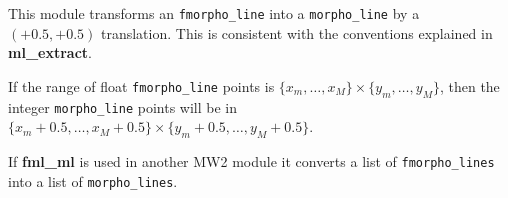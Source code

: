 This module transforms an {\tt fmorpho\_line} into 
a {\tt morpho\_line} by a $(+0.5,+0.5)$ translation.
This is consistent with the conventions explained in
{\bf ml\_extract}.

\medskip

If the range of float {\tt fmorpho\_line} points is
$\{x_m,\ldots,x_M\}\times\{y_m,\ldots,y_M\}$, then the 
integer {\tt morpho\_line} points will be in
$\{x_m+0.5,\ldots,x_M+0.5\}\times\{y_m+0.5,\ldots,y_M+0.5\}$.

\medskip

If {\bf fml\_ml} is used in another MW2 module it converts
a list of {\tt fmorpho\_lines} into a list of {\tt morpho\_lines}.
